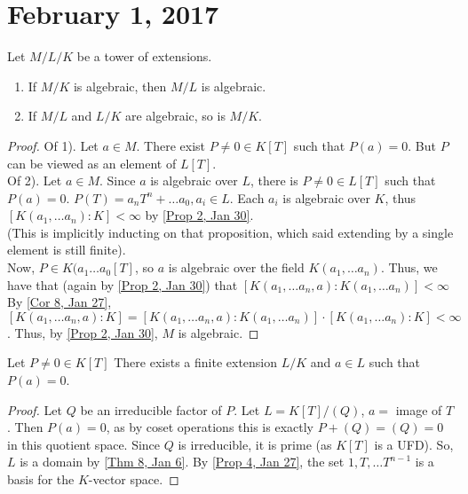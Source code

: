 \section{February 1, 2017}
\begin{prop} \label{Prop 1, Feb 1}
    Let $M / L / K$ be a tower of extensions.
    \begin{enumerate}[1)]
        \item If $M / K$ is algebraic, then $M / L$ is algebraic.
        \item If $M / L$ and $L / K$ are algebraic, so is $M/K$.
    \end{enumerate}
\end{prop}

\begin{proof}
    Of 1). Let $a \in M$. There exist $P \neq 0 \in K[T]$ such that $P(a) = 0$. But
    $P$ can be viewed as an element of $L[T]$. \\
    Of 2). Let $a \in M$. Since $a$ is algebraic over $L$, there is $P \neq 0 \in L[T]$
    such that $P(a) = 0$. $P(T) = a_nT^n + \dots a_0, a_i \in L$. Each $a_i$ is
    algebraic over $K$, thus $[K(a_1, \dots a_n) : K] < \infty$ by \ref{Prop 2, Jan 30}. \\
    (This is implicitly inducting on that proposition, which said extending by a single
    element is still finite). \\
    Now, $P \in K(a_1 \dots a_0[T]$, so $a$ is algebraic over the field $K(a_1, \dots a_n)$.
    Thus, we have that (again by \ref{Prop 2, Jan 30}) that $[K(a_1, \dots a_n, a) : K(a_1, \dots a_n)] < \infty$
    By \ref{Cor 8, Jan 27}, $[K(a_1, \dots a_n, a) : K] = [K(a_1, \dots a_n, a) : K(a_1, \dots a_n)] \cdot
    [K(a_1, \dots a_n) : K] < \infty$. Thus, by \ref{Prop 2, Jan 30}, $M$ is algebraic.
\end{proof}

\begin{prop}\label{Prop 2, Feb 1}
    Let $P \neq 0 \in K[T]$ There exists a finite extension $L / K$ and $a \in L$
    such that $P(a) = 0$.
\end{prop}
\begin{proof}
    Let $Q$ be an irreducible factor of $P$. Let $L = K[T] / (Q)$, $a =$ image of $T$.
    Then $P(a) = 0$, as by coset operations this is exactly $P + (Q) = (Q) = 0$ in this
    quotient space. Since $Q$ is irreducible, it is prime (as $K[T]$ is a UFD). So,
    $L$ is a domain by \ref{Thm 8, Jan 6}. By \ref{Prop 4, Jan 27}, the set $1, T, \dots T^{n-1}$ is
    a basis for the $K$-vector space.
\end{proof}

